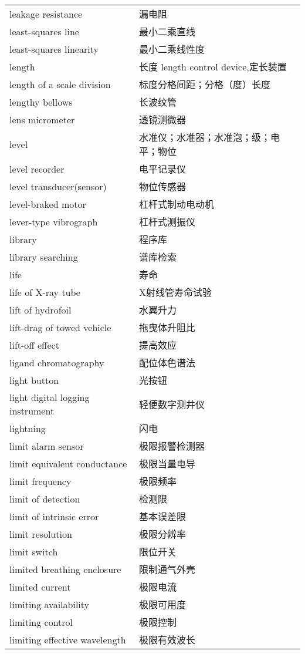 \documentclass[
]{article}
\begin{document}
\begin{longtable}[]{@{}ll@{}}
leakage resistance & 漏电阻 \\
least-squares line & 最小二乘直线 \\
least-squares linearity & 最小二乘线性度 \\
length & 长度 length control device,定长装置 \\
length of a scale division & 标度分格间距；分格（度）长度 \\
lengthy bellows & 长波纹管 \\
lens micrometer & 透镜测微器 \\
level & 水准仪；水准器；水准泡；级；电平；物位 \\
level recorder & 电平记录仪 \\
level transducer(sensor) & 物位传感器 \\
level-braked motor & 杠杆式制动电动机 \\
lever-type vibrograph & 杠杆式测振仪 \\
library & 程序库 \\
library searching & 谱库检索 \\
life & 寿命 \\
life of X-ray tube & X射线管寿命试验 \\
lift of hydrofoil & 水翼升力 \\
lift-drag of towed vehicle & 拖曳体升阻比 \\
lift-off effect & 提高效应 \\
ligand chromatography & 配位体色谱法 \\
light button & 光按钮 \\
light digital logging instrument & 轻便数字测井仪 \\
lightning & 闪电 \\
limit alarm sensor & 极限报警检测器 \\
limit equivalent conductance & 极限当量电导 \\
limit frequency & 极限频率 \\
limit of detection & 检测限 \\
limit of intrinsic error & 基本误差限 \\
limit resolution & 极限分辨率 \\
limit switch & 限位开关 \\
limited breathing enclosure & 限制通气外壳 \\
limited current & 极限电流 \\
limiting availability & 极限可用度 \\
limiting control & 极限控制 \\
limiting effective wavelength & 极限有效波长 \\

\end{longtable}
\end{document}
